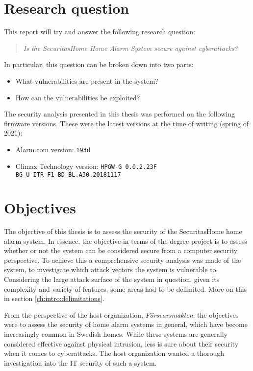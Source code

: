 \section{Research question} \label{ch:intro:research-question}
This report will try and answer the following research question:

\begin{quote}
    \textit{Is the SecuritasHome Home Alarm System secure against cyberattacks?}
\end{quote}

In particular, this question can be broken down into two parts:

\begin{itemize}
    \item What vulnerabilities are present in the system?
    \item How can the vulnerabilities be exploited?
\end{itemize}

The security analysis presented in this thesis was performed on the following firmware versions. These were the latest versions at the time of writing (spring of 2021):
\begin{itemize}
    \item Alarm.com version: \texttt{193d}
    \item Climax Technology version: \texttt{HPGW-G 0.0.2.23F\\ BG\_U-ITR-F1-BD\_BL.A30.20181117}
\end{itemize}

\section{Objectives} \label{ch:intro:objectives}
The objective of this thesis is to assess the security of the SecuritasHome home alarm system. In essence, the objective in terms of the degree project is to assess whether or not the system can be considered secure from a computer security perspective. To achieve this a comprehensive security analysis was made of the system, to investigate which attack vectors the system is vulnerable to. Considering the large attack surface of the system in question, given its complexity and variety of features, some areas had to be delimited. More on this in section \ref{ch:intro:delimitations}.

From the perspective of the host organization, \textit{Försvarsmakten}, the objectives were to assess the security of home alarm systems in general, which have become increasingly common in Swedish homes. While these systems are generally considered effective against physical intrusion, less is sure about their security when it comes to cyberattacks. The host organization wanted a thorough investigation into the IT security of such a system.

